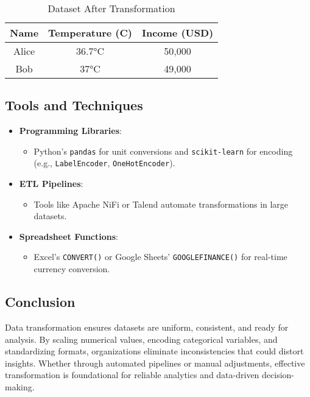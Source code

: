 \documentclass[12pt]{article}
\begin{document}
\begin{table}[h!]
    \centering
    \begin{tabular}{|c|c|c|}
        \hline
        \textbf{Name} & \textbf{Temperature (C)} & \textbf{Income (USD)} \\
        \hline
        Alice & 36.7°C & 50,000 \\
        Bob & 37°C & 49,000 \\
        \hline
    \end{tabular}
    \caption{Dataset After Transformation}
    \label{tab:after_transformation}
\end{table}

\subsection{Tools and Techniques}
\begin{itemize}
    \item \textbf{Programming Libraries}:
    \begin{itemize}
        \item Python’s \texttt{pandas} for unit conversions and \texttt{scikit-learn} for encoding (e.g., \texttt{LabelEncoder}, \texttt{OneHotEncoder}).
    \end{itemize}
    \item \textbf{ETL Pipelines}:
    \begin{itemize}
        \item Tools like Apache NiFi or Talend automate transformations in large datasets.
    \end{itemize}
    \item \textbf{Spreadsheet Functions}:
    \begin{itemize}
        \item Excel’s \texttt{CONVERT()} or Google Sheets’ \texttt{GOOGLEFINANCE()} for real-time currency conversion.
    \end{itemize}
\end{itemize}

\subsection{Conclusion}
Data transformation ensures datasets are uniform, consistent, and ready for analysis. By scaling numerical values, encoding categorical variables, and standardizing formats, organizations eliminate inconsistencies that could distort insights. Whether through automated pipelines or manual adjustments, effective transformation is foundational for reliable analytics and data-driven decision-making.
\end{document}
